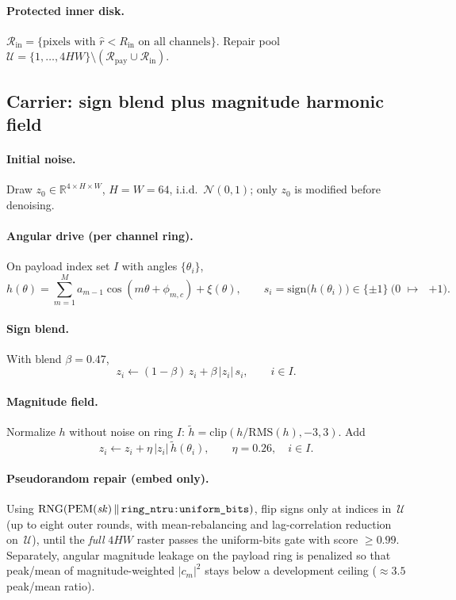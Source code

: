 \paragraph{Protected inner disk.}
$\mathcal{R}_{\mathrm{in}}=\{\text{pixels with }\hat r<R_{\mathrm{in}}\text{ on all channels}\}$.
Repair pool $\mathcal{U}=\{1,\ldots,4HW\}\setminus(\mathcal{R}_{\mathrm{pay}}\cup\mathcal{R}_{\mathrm{in}})$.

\subsection{Carrier: sign blend plus magnitude harmonic field}
\label{sec:b3-carrier}

\paragraph{Initial noise.}
Draw $z_0\in\mathbb{R}^{4\times H\times W}$, $H=W=64$, i.i.d.\ $\mathcal{N}(0,1)$;
only $z_0$ is modified before denoising.

\paragraph{Angular drive (per channel ring).}
On payload index set $I$ with angles $\{\theta_i\}$,
\[
h(\theta)=\sum_{m=1}^{M} a_{m-1}\cos(m\theta+\phi_{m,c})+\xi(\theta),\qquad
s_i=\mathrm{sign}\bigl(h(\theta_i)\bigr)\in\{\pm1\}\ \text{(0 $\mapsto$ $+1$)}.
\]

\paragraph{Sign blend.}
With blend $\beta=0.47$,
\[
z_i \leftarrow (1-\beta)\,z_i + \beta\,|z_i|\,s_i,\qquad i\in I.
\]

\paragraph{Magnitude field.}
Normalize $h$ without noise on ring $I$:
$\widetilde h=\mathrm{clip}(h/\mathrm{RMS}(h),-3,3)$.
Add
\[
z_i \leftarrow z_i + \eta\,|z_i|\,\widetilde h(\theta_i),\qquad \eta=0.26,\quad i\in I.
\]

\paragraph{Pseudorandom repair (embed only).}
Using $\mathrm{RNG}(\mathrm{PEM}(\mathit{sk})\,\|\,\text{\texttt{ring\_ntru:uniform\_bits}})$,
flip signs only at indices in~$\mathcal{U}$ (up to eight outer rounds, with
mean-rebalancing and lag-correlation reduction on~$\mathcal{U}$), until the
\emph{full} $4HW$ raster passes the uniform-bits gate with score $\ge 0.99$.
Separately, angular magnitude leakage on the payload ring is penalized so that
peak/mean of magnitude-weighted $|c_m|^2$ stays below a development ceiling
($\approx 3.5$ peak/mean ratio).

